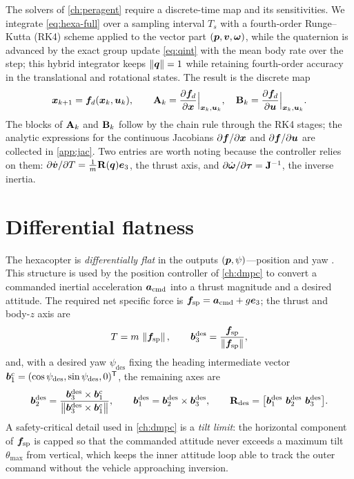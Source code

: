 The solvers of \cref{ch:peragent} require a discrete-time map and its
sensitivities. We integrate \cref{eq:hexa-full} over a sampling interval $T_s$
with a fourth-order Runge--Kutta (RK4) scheme applied to the vector part
$(\bm{p},\bm{v},\bm{\omega})$, while the quaternion is advanced by the exact
group update \cref{eq:qint} with the mean body rate over the step; this hybrid
integrator keeps $\left\lVert \bm{q} \right\rVert=1$ while retaining fourth-order accuracy in the
translational and rotational states. The result is the discrete map
\begin{equation}
\bm{x}_{k+1}=\bm{f}_d(\bm{x}_k,\bm{u}_k),
\qquad
\mathbf{A}_k=\frac{\partial\bm{f}_d}{\partial\bm{x}}\Big|_{\bm{x}_k,\bm{u}_k},
\quad
\mathbf{B}_k=\frac{\partial\bm{f}_d}{\partial\bm{u}}\Big|_{\bm{x}_k,\bm{u}_k}.
\label{eq:hexa-disc}
\end{equation}
The blocks of $\mathbf{A}_k$ and $\mathbf{B}_k$ follow by the chain rule through the
RK4 stages; the analytic expressions for the continuous Jacobians
$\partial\bm{f}/\partial\bm{x}$ and $\partial\bm{f}/\partial\bm{u}$ are collected
in \cref{app:jac}. Two entries are worth noting because the controller relies on
them: $\partial\dot{\bm{v}}/\partial T=\tfrac1m\mathbf{R}(\bm{q})\bm{e}_3$, the
thrust axis, and $\partial\dot{\bm{\omega}}/\partial\bm{\tau}=\mathbf{J}^{-1}$, the
inverse inertia.

\section{Differential flatness}
\label{sec:hexa-flatness}

The hexacopter is \emph{differentially flat} in the outputs
$(\bm{p},\psi)$---position and yaw \cite{mellinger2011minimum}. This structure is
used by the position controller of \cref{ch:dmpc} to convert a commanded inertial
acceleration $\bm{a}_{\mathrm{cmd}}$ into a thrust magnitude and a desired
attitude. The required net specific force is $\bm{f}_{\mathrm{sp}}
=\bm{a}_{\mathrm{cmd}}+g\bm{e}_3$; the thrust and body-$z$ axis are
\begin{equation}
T=m\,\left\lVert \bm{f}_{\mathrm{sp}} \right\rVert,\qquad
\bm{b}_3^{\mathrm{des}}=\frac{\bm{f}_{\mathrm{sp}}}{\left\lVert \bm{f}_{\mathrm{sp}} \right\rVert},
\label{eq:flat1}
\end{equation}
and, with a desired yaw $\psi_{\mathrm{des}}$ fixing the heading intermediate
vector $\bm{b}_1^{c}=(\cos\psi_{\mathrm{des}},\sin\psi_{\mathrm{des}},0)^{\mathsf{T}}$, the
remaining axes are
\begin{equation}
\vv{b}_2^{\mathrm{des}}=\frac{\vv{b}_3^{\mathrm{des}}\times\vv{b}_1^{c}}
{\norm{\vv{b}_3^{\mathrm{des}}\times\vv{b}_1^{c}}},\qquad
\vv{b}_1^{\mathrm{des}}=\vv{b}_2^{\mathrm{des}}\times\vv{b}_3^{\mathrm{des}},\qquad
\mat{R}_{\mathrm{des}}=\bigl[\vv{b}_1^{\mathrm{des}}\ \vv{b}_2^{\mathrm{des}}\ \vv{b}_3^{\mathrm{des}}\bigr].
\label{eq:flat2}
\end{equation}
A safety-critical detail used in \cref{ch:dmpc} is a \emph{tilt limit}: the
horizontal component of $\bm{f}_{\mathrm{sp}}$ is capped so that the commanded
attitude never exceeds a maximum tilt $\theta_{\max}$ from vertical, which keeps
the inner attitude loop able to track the outer command without the vehicle
approaching inversion.

